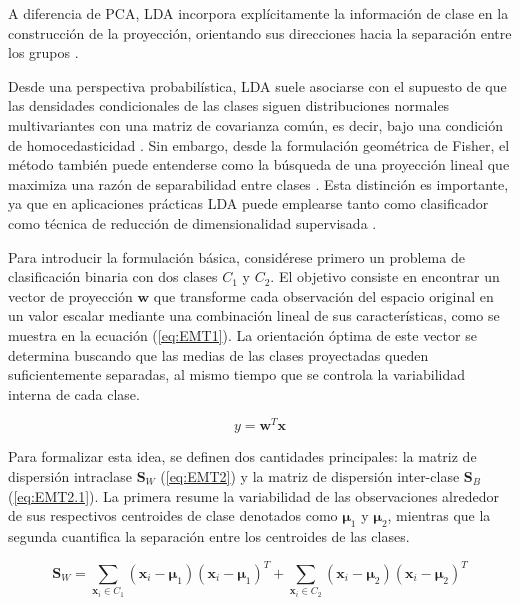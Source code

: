 A diferencia de PCA, LDA incorpora explícitamente la información de clase en la construcción de la proyección, orientando sus direcciones hacia la separación entre los grupos  \cite{bishop2006pattern}.

Desde una perspectiva probabilística, LDA suele asociarse con el supuesto de que las densidades condicionales de las clases siguen distribuciones normales multivariantes con una matriz de covarianza común, es decir, bajo una condición de homocedasticidad \cite{mclachlan1992discriminant}. Sin embargo, desde la formulación geométrica de Fisher, el método también puede entenderse como la búsqueda de una proyección lineal que maximiza una razón de separabilidad entre clases \cite{fisher1936use}. Esta distinción es importante, ya que en aplicaciones prácticas LDA puede emplearse tanto como clasificador como técnica de reducción de dimensionalidad supervisada \cite{martinez2001pca}.

Para introducir la formulación básica, considérese primero un problema de clasificación binaria con dos clases $C_1$ y $C_2$. El objetivo consiste en encontrar un vector de proyección $\mathbf{w}$ que transforme cada observación del espacio original en un valor escalar mediante una combinación lineal de sus características, como se muestra en la ecuación (\ref{eq:EMT1}). La orientación óptima de este vector se determina buscando que las medias de las clases proyectadas queden suficientemente separadas, al mismo tiempo que se controla la variabilidad interna de cada clase.

\begin{equation}
	y = \mathbf{w}^T\mathbf{x}
	\label{eq:EMT1}
\end{equation}

Para formalizar esta idea, se definen dos cantidades principales: la matriz de dispersión intraclase $\mathbf{S}_W$ (\ref{eq:EMT2}) y la matriz de dispersión inter-clase $\mathbf{S}_B$ (\ref{eq:EMT2.1}). La primera resume la variabilidad de las observaciones alrededor de sus respectivos centroides de clase denotados como $\mathbf{\mu}_1$ y $\mathbf{\mu}_2$, mientras que la segunda cuantifica la separación entre los centroides de las clases. 

\begin{equation}
	\mathbf{S}_W = \sum_{\mathbf{x}_i \in C_1} (\mathbf{x}_i - \mathbf{\mu}_1)(\mathbf{x}_i - \mathbf{\mu}_1)^T + \sum_{\mathbf{x}_i \in C_2} (\mathbf{x}_i - \mathbf{\mu}_2)(\mathbf{x}_i - \mathbf{\mu}_2)^T
	\label{eq:EMT2}
\end{equation}

